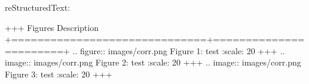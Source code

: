 \documentclass[letterpaper,12pt,english]{sphinxmanual}
\begin{document}
reStructuredText:

\begin{sphinxVerbatim}[commandchars=\\\{\}]
+\PYGZhy{}\PYGZhy{}\PYGZhy{}\PYGZhy{}\PYGZhy{}\PYGZhy{}\PYGZhy{}\PYGZhy{}\PYGZhy{}\PYGZhy{}\PYGZhy{}\PYGZhy{}\PYGZhy{}\PYGZhy{}\PYGZhy{}\PYGZhy{}\PYGZhy{}\PYGZhy{}\PYGZhy{}\PYGZhy{}\PYGZhy{}\PYGZhy{}\PYGZhy{}\PYGZhy{}\PYGZhy{}\PYGZhy{}\PYGZhy{}\PYGZhy{}\PYGZhy{}\PYGZhy{}+\PYGZhy{}\PYGZhy{}\PYGZhy{}\PYGZhy{}\PYGZhy{}\PYGZhy{}\PYGZhy{}\PYGZhy{}\PYGZhy{}\PYGZhy{}\PYGZhy{}\PYGZhy{}\PYGZhy{}\PYGZhy{}\PYGZhy{}\PYGZhy{}\PYGZhy{}\PYGZhy{}\PYGZhy{}\PYGZhy{}\PYGZhy{}\PYGZhy{}\PYGZhy{}+
 Figures                      \textbar{} Description           \textbar{}
+==============================+=======================+
 .. figure:: images/corr.png  \textbar{} Figure 1: test        \textbar{}
    :scale: 20 \PYGZpc{}              \textbar{}                       \textbar{}
+\PYGZhy{}\PYGZhy{}\PYGZhy{}\PYGZhy{}\PYGZhy{}\PYGZhy{}\PYGZhy{}\PYGZhy{}\PYGZhy{}\PYGZhy{}\PYGZhy{}\PYGZhy{}\PYGZhy{}\PYGZhy{}\PYGZhy{}\PYGZhy{}\PYGZhy{}\PYGZhy{}\PYGZhy{}\PYGZhy{}\PYGZhy{}\PYGZhy{}\PYGZhy{}\PYGZhy{}\PYGZhy{}\PYGZhy{}\PYGZhy{}\PYGZhy{}\PYGZhy{}\PYGZhy{}+\PYGZhy{}\PYGZhy{}\PYGZhy{}\PYGZhy{}\PYGZhy{}\PYGZhy{}\PYGZhy{}\PYGZhy{}\PYGZhy{}\PYGZhy{}\PYGZhy{}\PYGZhy{}\PYGZhy{}\PYGZhy{}\PYGZhy{}\PYGZhy{}\PYGZhy{}\PYGZhy{}\PYGZhy{}\PYGZhy{}\PYGZhy{}\PYGZhy{}\PYGZhy{}+
 .. image:: images/corr.png   \textbar{} Figure 2: test        \textbar{}
    :scale: 20 \PYGZpc{}              \textbar{}                       \textbar{}
+\PYGZhy{}\PYGZhy{}\PYGZhy{}\PYGZhy{}\PYGZhy{}\PYGZhy{}\PYGZhy{}\PYGZhy{}\PYGZhy{}\PYGZhy{}\PYGZhy{}\PYGZhy{}\PYGZhy{}\PYGZhy{}\PYGZhy{}\PYGZhy{}\PYGZhy{}\PYGZhy{}\PYGZhy{}\PYGZhy{}\PYGZhy{}\PYGZhy{}\PYGZhy{}\PYGZhy{}\PYGZhy{}\PYGZhy{}\PYGZhy{}\PYGZhy{}\PYGZhy{}\PYGZhy{}+\PYGZhy{}\PYGZhy{}\PYGZhy{}\PYGZhy{}\PYGZhy{}\PYGZhy{}\PYGZhy{}\PYGZhy{}\PYGZhy{}\PYGZhy{}\PYGZhy{}\PYGZhy{}\PYGZhy{}\PYGZhy{}\PYGZhy{}\PYGZhy{}\PYGZhy{}\PYGZhy{}\PYGZhy{}\PYGZhy{}\PYGZhy{}\PYGZhy{}\PYGZhy{}+
 .. image:: images/corr.png   \textbar{} Figure 3: test        \textbar{}
    :scale: 20 \PYGZpc{}              \textbar{}                       \textbar{}
+\PYGZhy{}\PYGZhy{}\PYGZhy{}\PYGZhy{}\PYGZhy{}\PYGZhy{}\PYGZhy{}\PYGZhy{}\PYGZhy{}\PYGZhy{}\PYGZhy{}\PYGZhy{}\PYGZhy{}\PYGZhy{}\PYGZhy{}\PYGZhy{}\PYGZhy{}\PYGZhy{}\PYGZhy{}\PYGZhy{}\PYGZhy{}\PYGZhy{}\PYGZhy{}\PYGZhy{}\PYGZhy{}\PYGZhy{}\PYGZhy{}\PYGZhy{}\PYGZhy{}\PYGZhy{}+\PYGZhy{}\PYGZhy{}\PYGZhy{}\PYGZhy{}\PYGZhy{}\PYGZhy{}\PYGZhy{}\PYGZhy{}\PYGZhy{}\PYGZhy{}\PYGZhy{}\PYGZhy{}\PYGZhy{}\PYGZhy{}\PYGZhy{}\PYGZhy{}\PYGZhy{}\PYGZhy{}\PYGZhy{}\PYGZhy{}\PYGZhy{}\PYGZhy{}\PYGZhy{}+
\end{sphinxVerbatim}
\end{document}

